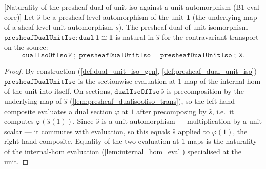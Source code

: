 \begin{lemma}



[Naturality of the presheaf dual-of-unit iso against a unit automorphism (B1 eval-core)]
  \label{lem:presheafdualunitiso_naturality}
  Let \(\hat s\) be a presheaf-level automorphism of the unit \(\mathbf 1\) (the underlying map of a
  sheaf-level unit automorphism \(s\)). The presheaf dual-of-unit isomorphism
  \(\mathtt{presheafDualUnitIso} : \mathtt{dual}\,\mathbf 1 \cong \mathbf 1\) is natural in
  \(\hat s\) for the contravariant transport on the source:
  \[
    \mathtt{dualIsoOfIso}\,\hat s \;\mathbin{;}\; \mathtt{presheafDualUnitIso}
      = \mathtt{presheafDualUnitIso} \;\mathbin{;}\; \hat s.
  \]
\end{lemma}
\begin{proof}
  By construction (\cref{def:dual_unit_iso_gen}, \cref{def:presheaf_dual_unit_iso})
  \(\mathtt{presheafDualUnitIso}\) is the sectionwise evaluation-at-\(1\) map of the internal hom of
  the unit into itself. On sections, \(\mathtt{dualIsoOfIso}\,\hat s\) is precomposition by the
  underlying map of \(\hat s\) (\cref{lem:presheaf_dualisoofiso_trans}), so the left-hand composite
  evaluates a dual section \(\varphi\) at \(1\) after precomposing by \(\hat s\), i.e.\ it computes
  \(\varphi(\hat s(1))\). Since \(\hat s\) is a unit automorphism --- multiplication by a unit scalar
  --- it commutes with evaluation, so this equals \(\hat s\) applied to \(\varphi(1)\), the
  right-hand composite. Equality of the two evaluation-at-\(1\) maps is the naturality of the
  internal-hom evaluation (\cref{lem:internal_hom_eval}) specialised at the unit.
\end{proof}

